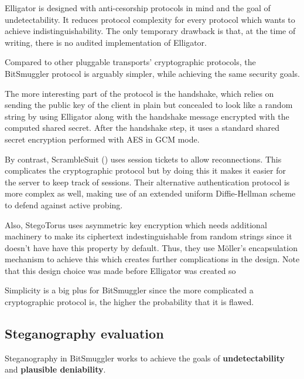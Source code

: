 \documentclass[11pt]{book} %
\newcommand{\projectName}{BitSmuggler }
\begin{document}
Elligator is designed with anti-cesorship protocols in mind and the goal of undetectability. It reduces protocol complexity \citep*{elligator} for every protocol which wants to achieve indistinguishability. The only temporary drawback is that, at the time of writing, there is no audited implementation of Elligator.


Compared to other pluggable transports' cryptographic protocols, the \projectName protocol is arguably simpler, while achieving the same security goals.

The more interesting part of the protocol is the handshake, which relies on sending the public key of the client in plain but concealed to look like a random string by using Elligator along with the handshake message encrypted with the computed shared secret. After the handshake step, it uses a standard shared secret encryption performed with AES in GCM mode. 

By contrast, ScrambleSuit (\citep*{scrambleSuit}) uses session tickets to allow reconnections. This complicates the cryptographic protocol but by doing this it makes it easier for the server to keep track of sessions. Their alternative authentication protocol is more complex as well, making use of an extended uniform Diffie-Hellman scheme to defend against active probing.

Also, StegoTorus \citep*{stegotorus} uses asymmetric key encryption which needs additional machinery to make its ciphertext indestinguishable from random strings since it doesn't have have this property by default. Thus, they use M\"{o}ller's encapsulation mechanism to achieve this which creates further complications in the design. Note that this design choice was made before Elligator was created so

Simplicity is a big plus for \projectName since the more complicated a cryptographic protocol is, the higher the probability that it is flawed.


\subsection{Steganography evaluation}
\label{eval:steg}

Steganography in \projectName works to achieve the goals of \textbf{undetectability} and \textbf{plausible deniability}.
\end{document}
